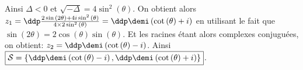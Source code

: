 \begin{correction}
\begin{enumerate}
\begin{itemize}
Ainsi $\Delta<0$ et $\sqrt{-\Delta}=4\sin^2{(\theta)}$.
On obtient alors $z_1=\ddp\frac{ 2\sin{(2\theta)} +4i\sin^2{(\theta)}  }{ 4\times 2\sin^2{(\theta)}}=\ddp\demi\left( \cot{(\theta)}+i \right)$
en utilisant le fait que $\sin{(2\theta)}=2\cos{(\theta)}\sin{(\theta)}$. Et les racines \'etant alors complexes conjugu\'ees, on obtient: $z_2=\ddp\demi\left( \cot{(\theta)}-i \right)$. Ainsi $\fbox{$ \mathcal{S}=\left\lbrace \ddp\demi\left( \cot{(\theta)}-i \right),\ddp\demi\left( \cot{(\theta)}+i \right) \right\rbrace $}$.
\end{itemize}

\end{enumerate}
\end{correction}
